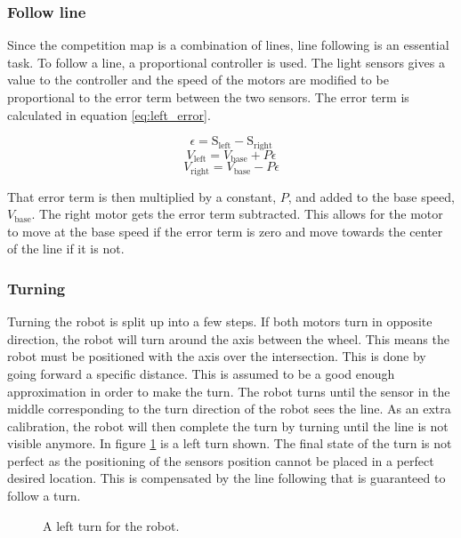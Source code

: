 \subsubsection{Follow line}
Since the competition map is a combination of lines, line following is an essential task.
To follow a line, a proportional controller is used.
The light sensors gives a value to the controller and the speed of the motors are modified to be proportional to the error term between the two sensors.
The error term is calculated in equation \ref{eq:left_error}.

\begin{equation}
  \epsilon = \text{S}_{\text{left}} - \text{S}_{\text{right}}
 \label{eq:left_error}
\end{equation}
\begin{equation}
  V_\text{left} = V_\text{base} + P \epsilon
 \label{eq:left_speed}
\end{equation}
\begin{equation}
  V_\text{right} = V_\text{base} - P \epsilon
 \label{eq:right_speed}
\end{equation}

That error term is then multiplied by a constant, $P$, and added to the base speed, $V_\text{base}$.
The right motor gets the error term subtracted.
This allows for the motor to move at the base speed if the error term is zero and move towards the center of the line if it is not.

\subsubsection{Turning}
Turning the robot is split up into a few steps.
If both motors turn in opposite direction, the robot will turn around the axis between the wheel.
This means the robot must be positioned with the axis over the intersection.
This is done by going forward a specific distance.
This is assumed to be a good enough approximation in order to make the turn.
The robot turns until the sensor in the middle corresponding to the turn direction of the robot sees the line.
As an extra calibration, the robot will then complete the turn by turning until the line is not visible anymore.
In figure \ref{fig:left_turn} is a left turn shown.
The final state of the turn is not perfect as the positioning of the sensors position cannot be placed in a perfect desired location.
This is compensated by the line following that is guaranteed to follow a turn.

\begin{figure}[H]

 \caption{A left turn for the robot.}
 \label{fig:left_turn}
\end{figure}

